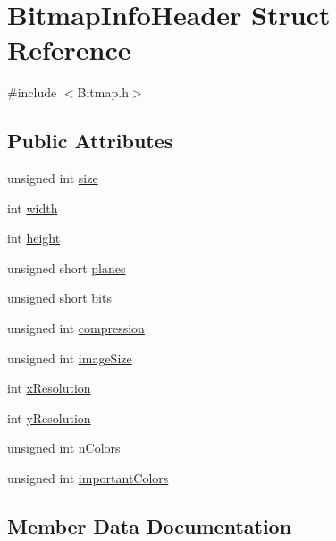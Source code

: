 \hypertarget{structBitmapInfoHeader}{}\section{Bitmap\+Info\+Header Struct Reference}
\label{structBitmapInfoHeader}


{\ttfamily \#include $<$Bitmap.\+h$>$}

\subsection*{Public Attributes}
\begin{DoxyCompactItemize}
\item 
unsigned int \hyperlink{structBitmapInfoHeader_a411fa70f6547a0360b33edcd3273d169}{size}
\item 
int \hyperlink{structBitmapInfoHeader_ac2034cfbada460819beed1ee24581c5d}{width}
\item 
int \hyperlink{structBitmapInfoHeader_aaa1d31efc13210020a38d435e4961df9}{height}
\item 
unsigned short \hyperlink{structBitmapInfoHeader_a9925e97e8bbc6b797afe2d22fbab45d6}{planes}
\item 
unsigned short \hyperlink{structBitmapInfoHeader_a1eebafc33573852f62a2e3d8adc25349}{bits}
\item 
unsigned int \hyperlink{structBitmapInfoHeader_a87fb38b0fe68db4bed899b9733d1b7e9}{compression}
\item 
unsigned int \hyperlink{structBitmapInfoHeader_a79bc984a7fd1c0f00ede6aa09143939f}{image\+Size}
\item 
int \hyperlink{structBitmapInfoHeader_a391cf1da75d16aee3b6539ccf5b29300}{x\+Resolution}
\item 
int \hyperlink{structBitmapInfoHeader_af2fadf9c216cc9f3ce401096e35be1b7}{y\+Resolution}
\item 
unsigned int \hyperlink{structBitmapInfoHeader_a4c543a08d1b72bdda2329b426a213e2a}{n\+Colors}
\item 
unsigned int \hyperlink{structBitmapInfoHeader_a9d87941fcc414085f7361fd89818ee3f}{important\+Colors}
\end{DoxyCompactItemize}


\subsection{Member Data Documentation}
